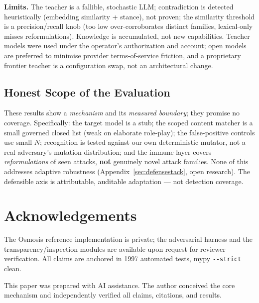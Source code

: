 \documentclass[11pt,a4paper]{article}
\begin{document}
\textbf{Limits.} The teacher is a fallible, stochastic LLM; contradiction is detected
heuristically (embedding similarity + stance), not proven; the similarity threshold is a
precision/recall knob (too low over-corroborates distinct families, lexical-only misses
reformulations). Knowledge is accumulated, not new capabilities. Teacher models were used
under the operator's authorization and account; open models are preferred to minimise
provider terms-of-service friction, and a proprietary frontier teacher is a configuration
swap, not an architectural change.

\subsection{Honest Scope of the Evaluation}

These results show a \emph{mechanism} and its \emph{measured boundary}; they promise no
coverage. Specifically: the target model is a stub; the scoped content matcher is a small
governed closed list (weak on elaborate role-play); the false-positive controls use small
$N$; recognition is tested against our own deterministic mutator, not a real adversary's
mutation distribution; and the immune layer covers \emph{reformulations} of seen attacks,
\textbf{not} genuinely novel attack families. None of this addresses adaptive robustness
(Appendix~\ref{sec:defensestack}, open research). The defensible axis is attributable,
auditable adaptation --- not detection coverage.

\section*{Acknowledgements}

The Osmosis reference implementation is private; the adversarial harness and the
transparency/inspection modules are available upon request for reviewer verification.
All claims are anchored in 1997 automated tests, mypy \texttt{-{}-strict} clean.

This paper was prepared with AI assistance. The author conceived the core mechanism
and independently verified all claims, citations, and results.



\end{document}
